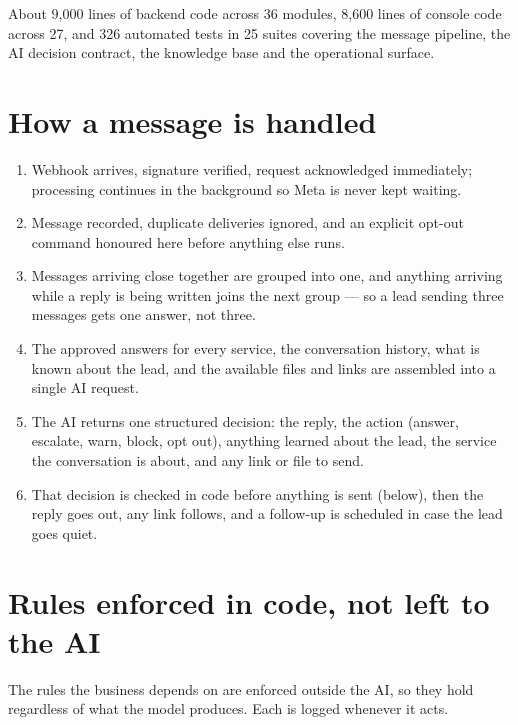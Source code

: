 \documentclass[10pt,a4paper]{article}
\begin{document}
\vspace{2pt}
About 9{,}000 lines of backend code across 36 modules, 8{,}600 lines of console
code across 27, and 326 automated tests in 25 suites covering the message
pipeline, the AI decision contract, the knowledge base and the operational
surface.

\section{How a message is handled}

\begin{enumerate}
\item Webhook arrives, signature verified, request acknowledged immediately;
processing continues in the background so Meta is never kept waiting.
\item Message recorded, duplicate deliveries ignored, and an explicit opt-out
command honoured here before anything else runs.
\item Messages arriving close together are grouped into one, and anything
arriving while a reply is being written joins the next group --- so a lead
sending three messages gets one answer, not three.
\item The approved answers for every service, the conversation history, what is
known about the lead, and the available files and links are assembled into a
single AI request.
\item The AI returns one structured decision: the reply, the action (answer,
escalate, warn, block, opt out), anything learned about the lead, the service
the conversation is about, and any link or file to send.
\item That decision is checked in code before anything is sent (below), then
the reply goes out, any link follows, and a follow-up is scheduled in case the
lead goes quiet.
\end{enumerate}

\section{Rules enforced in code, not left to the AI}

The rules the business depends on are enforced outside the AI, so they hold
regardless of what the model produces. Each is logged whenever it acts.
\end{document}

